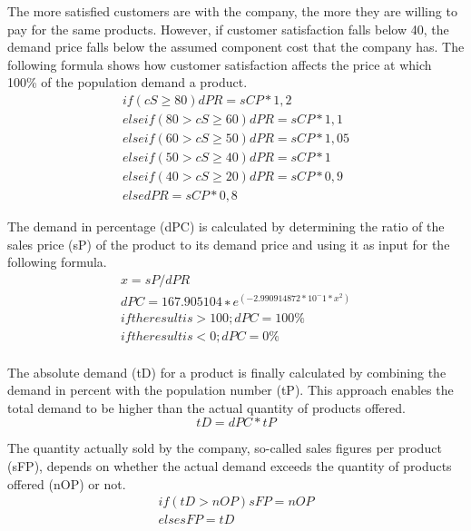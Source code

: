 The more satisfied customers are with the company, the more they are willing to pay for the same products. However, if customer satisfaction falls below 40, the demand price falls below the assumed component cost that the company has. The following formula shows how customer satisfaction affects the price at which 100\% of the population demand a product.
\begin{equation}
\begin{aligned}
if ( cS \geq 80 ) { dPR = sCP * 1,2 } \\
elseif ( 80 > cS \geq 60 ){ dPR = sCP * 1,1 } \\
elseif ( 60 > cS \geq 50 ) { dPR = sCP * 1,05 } \\
elseif ( 50 > cS \geq 40 ) { dPR = sCP * 1 } \\
elseif ( 40 > cS \geq 20 ) { dPR = sCP * 0,9 } \\
else { dPR = sCP * 0,8 }  
\end{aligned}
\end{equation}

The demand in percentage (\gls{dPC}) is calculated by determining the ratio of the sales price (\gls{sP}) of the product to its demand price and using it as input for the following formula.
\begin{equation}
\begin{aligned}
x = sP / dPR \\
dPC = 167.905104 ∗e^ (−2.990914872 * 10^ -1 * x^2) \\
if the result is > 100; dPC = 100\% \\
if the result is < 0; dPC = 0\% \\    
\end{aligned}
\end{equation}
 
The absolute demand (\gls{tD}) for a product is finally calculated by combining the demand in percent with the population number (\gls{tP}). This approach enables the total demand to be higher than the actual quantity of products offered.
\begin{equation}
tD= dPC * tP    
\end{equation}

The quantity actually sold by the company, so-called sales figures per product (\gls{sFP}), depends on whether the actual demand exceeds the quantity of products offered (\gls{nOP}) or not.
\begin{equation}
\begin{aligned}
if ( tD > nOP ) { sFP = nOP } \\
else { sFP = tD }    
\end{aligned}
\end{equation}


